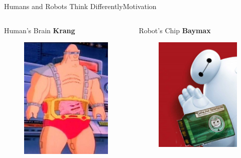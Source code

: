 \begin{frame}{Humans and Robots Think Differently}{Motivation}
\begin{columns}
\begin{block}{ Human's Brain }
\centering
{\bf Krang}
\begin{figure}
	\centering
	\includegraphics[width=.7\linewidth]{figure/human_brain}
\end{figure}
\end{block}	
\begin{block}{ Robot's Chip }
\centering
{\bf Baymax}
\begin{figure}
	\centering
	\includegraphics[width=.7\linewidth]{figure/baymax_and_chip}
\end{figure}
\end{block}	
\end{columns}

\end{frame}

